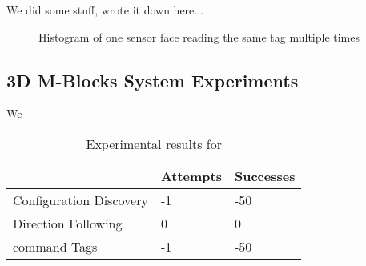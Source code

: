 We did some stuff, wrote it down here...

\begin{figure}[h]
	
	\caption{Histogram of one sensor face reading the same tag multiple times}
	\label{fig:histogram}
\end{figure}


\subsection{3D M-Blocks System Experiments}
\label{sec:mblocksExperiments}
We 

\begin{table}[h]
	\caption{Experimental results for }
	
	\begin{tabular}{ p{3.4cm}  p{1.9cm}  p{1.9cm} }
		\hline
								& Attempts 	& Successes \\
		\hline
		Configuration Discovery	&  -1 		& -50 \\
		Direction Following		& 0 		& 0  \\
		command Tags 			&  -1 		& -50 \\


		
	\end{tabular}
	
	\label{tab:info}
\end{table}

